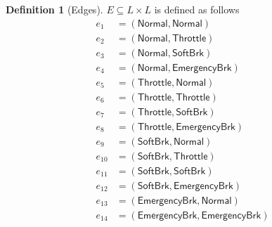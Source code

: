 \documentclass[journal]{IEEEtran}
\theoremstyle{definition}
\newtheorem{definition}{Definition}
\theoremstyle{property}
\newcommand{\Normal}{\mathsf{Normal}}
\newcommand{\Warning}{\mathsf{Warning}}
\newcommand{\Throttle}{\mathsf{Throttle}}
\newcommand{\SoftBrake}{\mathsf{SoftBrk}}
\newcommand{\EmergencyBrake}{\mathsf{EmergencyBrk}}
\begin{document}
\begin{definition}[Edges]\label{def:app_edges}
$E \subseteq L \times L$ is defined as follows
\[
\begin{aligned}
e_1 &= (\Normal, \Normal) \\
e_2 &= (\Normal, \Throttle) \\
e_3 &= (\Normal, \SoftBrake) \\
e_4 &= (\Normal, \EmergencyBrake) \\
e_{5} &= (\Throttle, \Normal) \\
e_{6} &= (\Throttle, \Throttle) \\
e_{7} &= (\Throttle, \SoftBrake) \\
e_{8} &= (\Throttle, \EmergencyBrake) \\
e_{9} &= (\SoftBrake, \Normal) \\
e_{10} &= (\SoftBrake, \Throttle) \\
e_{11} &= (\SoftBrake, \SoftBrake) \\
e_{12} &= (\SoftBrake, \EmergencyBrake) \\
e_{13} &= (\EmergencyBrake, \Normal) \\
e_{14} &= (\EmergencyBrake, \EmergencyBrake)
\end{aligned}
\]
\end{definition}
\end{document}
